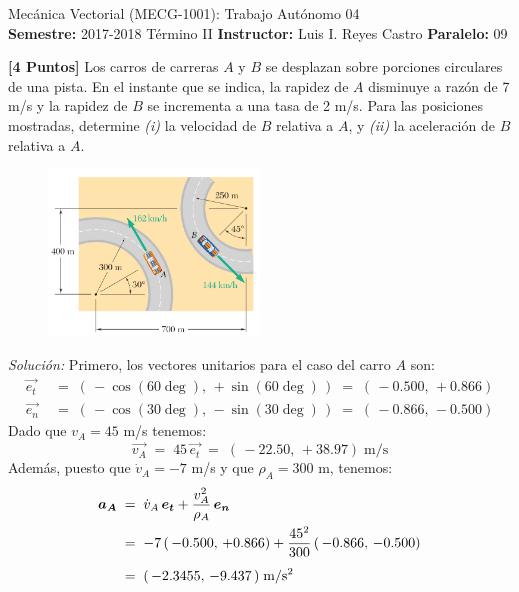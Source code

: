 \documentclass[ a4paper, twoside, 11pt]{article}
\newcommand{\numero}{04}
\begin{document}
\allowdisplaybreaks

\begin{center}
\Large Mec\'anica Vectorial (MECG-1001): Trabajo Aut\'onomo \numero \\[2ex]
\small \textbf{Semestre:} 2017-2018 T\'ermino II \qquad
\textbf{Instructor:} Luis I. Reyes Castro \qquad
\textbf{Paralelo:} 09
\end{center}
\fullskip

\begin{problem}
\textbf{[4 Puntos]} Los carros de carreras $A$ y $B$ se desplazan sobre porciones circulares de una pista. En el instante que se indica, la rapidez de $A$ disminuye a raz\'on de 7 m/s y la rapidez de $B$ se incrementa a una tasa de 2 m/s. Para las posiciones mostradas, determine \textit{(i)} la velocidad de
$B$ relativa a $A$, y \textit{(ii)} la aceleraci\'on de $B$ relativa a $A$.

\begin{figure}[htb]
\centering
\includegraphics[width=0.5\textwidth]{problema-1.jpg}
\end{figure}

\emph{Soluci\'on:} Primero, los vectores unitarios para el caso del carro $A$ son: 
\begin{align*}
\vec{e_t} \; & = \; ( \, -\cos(60\deg), \, +\sin(60\deg) \, )
\; = \; ( \, -0.500, \, +0.866) \\
\vec{e_n} \; & = \; ( \, -\cos(30\deg), \, -\sin(30\deg) \, )
\; = \; ( \, -0.866, \, -0.500)
\end{align*}
Dado que $v_A = 45$ m/s tenemos: 
\[
\vec{v_A} \; = \; 45 \, \vec{e_t}
\; = \; ( \, -22.50, \, +38.97) \; \text{m/s}
\]
Adem\'as, puesto que $\dot{v}_A = -7$ m/s y que $\rho_A = 300$ m, tenemos: 
\begin{align*}
{\boldsymbol{a_A}} \; & = \;
\dot{v}_A \, {\boldsymbol{e_t}} + \frac{v_A^2}{\rho_A} \, {\boldsymbol{e_n}} \\
& = \; -7 \, ( \, -0.500, \, +0.866)
+ \frac{45^2}{300} \, ( \, -0.866, \, -0.500) \\[1ex]
& = \; ( \, -2.3455, \, -9.437 \, ) \; \text{m/s\ensuremath{^{\text{2}}}}
\end{align*}


\end{problem}
\end{document}
